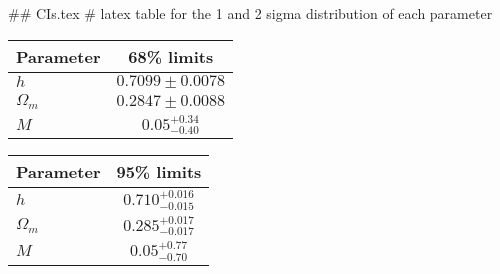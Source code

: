## CIs.tex
# latex table for the 1 and 2 sigma distribution of each parameter

\begin{tabular} { l  c}
 Parameter &  68\% limits\\
\hline
{\boldmath$h              $} & $0.7099\pm 0.0078          $\\
{\boldmath$\Omega_m       $} & $0.2847\pm 0.0088          $\\
{\boldmath$M              $} & $0.05^{+0.34}_{-0.40}      $\\
\hline
\end{tabular}

\begin{tabular} { l  c}
 Parameter &  95\% limits\\
\hline
{\boldmath$h              $} & $0.710^{+0.016}_{-0.015}   $\\
{\boldmath$\Omega_m       $} & $0.285^{+0.017}_{-0.017}   $\\
{\boldmath$M              $} & $0.05^{+0.77}_{-0.70}      $\\
\hline
\end{tabular}
